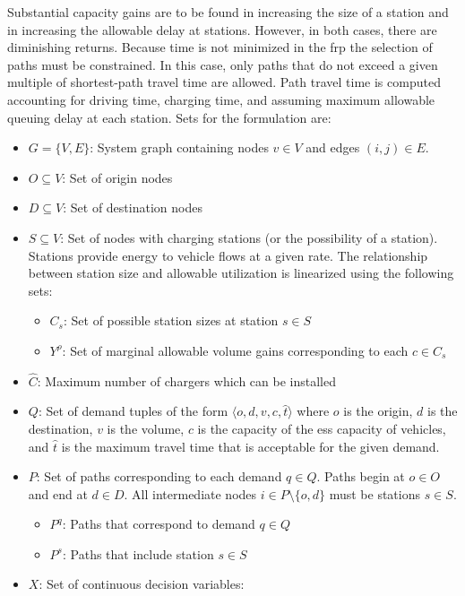 \documentclass[12pt]{article}
\begin{document}
Substantial capacity gains are to be found in increasing the size of a station and in increasing the allowable delay at stations. However, in both cases, there are diminishing returns. Because time is not minimized in the \gls{frp} the selection of paths must be constrained. In this case, only paths that do not exceed a given multiple of shortest-path travel time are allowed. Path travel time is computed accounting for driving time, charging time, and assuming maximum allowable queuing delay at each station. Sets for the formulation are:

\begin{itemize}
	\item $G = \{V, E\}$: System graph containing nodes $v \in V$ and edges $(i, j) \in E$.
	\item $O \subseteq V$: Set of origin nodes
	\item $D \subseteq V$: Set of destination nodes
	\item $S \subseteq V$: Set of nodes with charging stations (or the possibility of a station). Stations provide energy to vehicle flows at a given rate. The relationship between station size and allowable utilization is linearized using the following sets: \begin{itemize}
		\item $C_s$: Set of possible station sizes at station $s \in S$
		\item $Y^\rho$: Set of marginal allowable volume gains corresponding to each $c \in C_s$
	\end{itemize}
	\item $\hat{C}$: Maximum number of chargers which can be installed
	\item $Q$: Set of demand tuples of the form $\langle o, d, v, c, \hat{t} \rangle$ where $o$ is the origin, $d$ is the destination, $v$ is the volume, $c$ is the capacity of the \gls{ess} capacity of vehicles, and $\hat{t}$ is the maximum travel time that is acceptable for the given demand.
	\item $P$: Set of paths corresponding to each demand $q \in Q$. Paths begin at $o \in O$ and end at $d \in D$. All intermediate nodes $i \in P \setminus \{o, d\}$ must be stations $s \in S$.\begin{itemize}
		\item $P^q$: Paths that correspond to demand $q \in Q$
		\item $P^s$: Paths that include station $s \in S$
	\end{itemize}
	\item $X$: Set of continuous decision variables: \begin{itemize}

\end{itemize}
\end{itemize}
\end{document}
